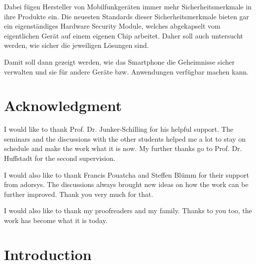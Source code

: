 \documentclass[12pt,oneside,a4paper,parskip]{scrbook}
\begin{document}
Dabei fügen Hersteller von Mobilfunkgeräten immer mehr Sicherheitsmerkmale in ihre Produkte ein. Die neuesten Standards dieser Sicherheitsmerkmale bieten gar ein eigenständiges Hardware Security Module, welches abgekapselt vom eigentlichen Gerät auf einem eigenen Chip arbeitet. Daher soll auch untersucht werden, wie sicher die jeweiligen Lösungen sind.

Damit soll dann gezeigt werden, wie das Smartphone die Geheimnisse sicher verwalten und sie für andere Geräte bzw. Anwendungen verfügbar machen kann.

\newpage
\chapter*{Acknowledgment}

I would like to thank Prof. Dr. Junker-Schilling for his helpful support. The seminars and the discussions with the other students helped me a lot to stay on schedule and make the work what it is now. My further thanks go to Prof. Dr. Huffstadt for the second supervision. 

I would also like to thank Francis Pouatcha and Steffen Blümm for their support from adorsys. The discussions always brought new ideas on how the work can be further improved. Thank you very much for that.

I would also like to thank my proofreaders and my family. Thanks to you too, the work has become what it is today.

\tableofcontents



\mainmatter

\chapter{Introduction}\label{ch:intro}
\end{document}
